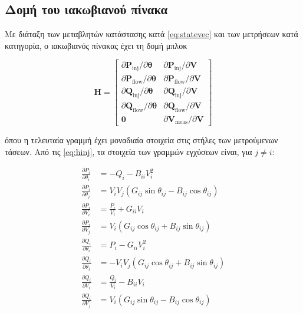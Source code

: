 \subsection{Δομή του ιακωβιανού πίνακα}

Με διάταξη των μεταβλητών κατάστασης κατά \eqref{eq:statevec} και των μετρήσεων κατά
κατηγορία, ο ιακωβιανός πίνακας έχει τη δομή μπλοκ

\begin{equation}
\mathbf{H} =
\begin{bmatrix}
\partial \mathbf{P}_{\mathrm{inj}} / \partial \boldsymbol{\theta} & \partial \mathbf{P}_{\mathrm{inj}} / \partial \mathbf{V} \\
\partial \mathbf{P}_{\mathrm{flow}} / \partial \boldsymbol{\theta} & \partial \mathbf{P}_{\mathrm{flow}} / \partial \mathbf{V} \\
\partial \mathbf{Q}_{\mathrm{inj}} / \partial \boldsymbol{\theta} & \partial \mathbf{Q}_{\mathrm{inj}} / \partial \mathbf{V} \\
\partial \mathbf{Q}_{\mathrm{flow}} / \partial \boldsymbol{\theta} & \partial \mathbf{Q}_{\mathrm{flow}} / \partial \mathbf{V} \\
\mathbf{0} & \partial \mathbf{V}_{\mathrm{meas}} / \partial \mathbf{V}
\end{bmatrix}
\label{eq:jacblocks}
\end{equation}

όπου η τελευταία γραμμή έχει μοναδιαία στοιχεία στις στήλες των μετρούμενων τάσεων. Από τις
\eqref{eq:hinj}, τα στοιχεία των γραμμών εγχύσεων είναι, για $j \neq i$:

\begin{align}
\frac{\partial P_i}{\partial \theta_i} &= -Q_i - B_{ii} V_i^2 \\
\frac{\partial P_i}{\partial \theta_j} &= V_i V_j \left( G_{ij}\sin\theta_{ij} - B_{ij}\cos\theta_{ij} \right) \\
\frac{\partial P_i}{\partial V_i} &= \frac{P_i}{V_i} + G_{ii} V_i \\
\frac{\partial P_i}{\partial V_j} &= V_i \left( G_{ij}\cos\theta_{ij} + B_{ij}\sin\theta_{ij} \right) \\
\frac{\partial Q_i}{\partial \theta_i} &= P_i - G_{ii} V_i^2 \\
\frac{\partial Q_i}{\partial \theta_j} &= -V_i V_j \left( G_{ij}\cos\theta_{ij} + B_{ij}\sin\theta_{ij} \right) \\
\frac{\partial Q_i}{\partial V_i} &= \frac{Q_i}{V_i} - B_{ii} V_i \\
\frac{\partial Q_i}{\partial V_j} &= V_i \left( G_{ij}\sin\theta_{ij} - B_{ij}\cos\theta_{ij} \right)
\label{eq:jacinj}
\end{align}

